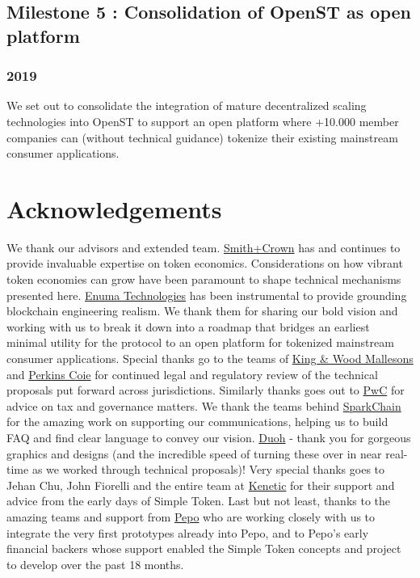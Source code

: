 \documentclass[12pt,a4paper, twocolumn]{article}
\begin{document}
\subsection{Milestone 5 : Consolidation of OpenST as open platform}
\subsubsection{2019}
We set out to consolidate the integration of mature decentralized scaling technologies into OpenST to support an open platform where +10.000 member companies can (without technical guidance) tokenize their existing mainstream consumer applications.

\section{Acknowledgements}
We thank our advisors and extended team.  \href{https://www.smithandcrown.com/}{Smith+Crown} has and continues to provide invaluable expertise on token economics.  Considerations on how vibrant token economies can grow have been paramount to shape technical mechanisms presented here.  \href{https://www.enuma.io/}{Enuma Technologies} has been instrumental to provide grounding blockchain engineering realism.  We thank them for sharing our bold vision and working with us to break it down into a roadmap that bridges an earliest minimal utility for the protocol to an open platform for tokenized mainstream consumer applications.  Special thanks go to the teams of \href{http://www.kwm.com/en/}{King \& Wood Mallesons} and \href{https://www.perkinscoie.com/en}{Perkins Coie} for continued legal and regulatory review of the technical proposals put forward across jurisdictions.  Similarly thanks goes out to \href{https://www.pwc.com/}{PwC} for advice on tax and governance matters.  We thank the teams behind \href{https://www.sparkchain.com/}{SparkChain} for the amazing work on supporting our communications, helping us to build FAQ and find clear language to convey our vision.  \href{http://www.duoh.com/}{Duoh} - thank you for gorgeous graphics and designs (and the incredible speed of turning these over in near real-time as we worked through technical proposals)!  Very special thanks goes to Jehan Chu, John Fiorelli and the entire team at \href{https://kenetic.capital/}{Kenetic} for their support and advice from the early days of Simple Token.  Last but not least, thanks to the amazing teams and support from \href{https://pepo.com/}{Pepo} who are working closely with us to integrate the very first prototypes already into Pepo, and to Pepo’s early financial backers whose support enabled the Simple Token concepts and project to develop over the past 18 months.\par
\end{document}
